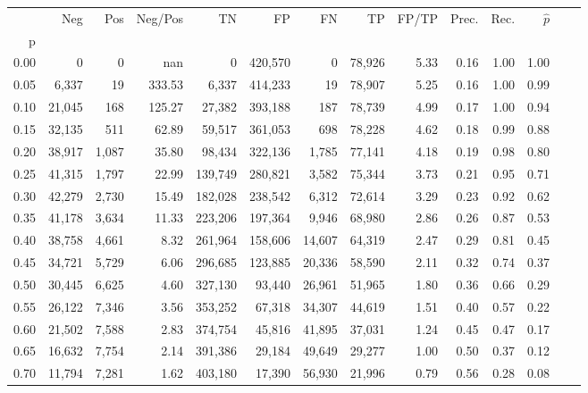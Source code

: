 \begin{tabular}{rrrrrrrrrrrrrr}
\toprule
{} &     Neg &    Pos & Neg/Pos &       TN &       FP &      FN &      TP & FP/TP & Prec. &  Rec. & $\hat{p}$ \\
p    &         &        &         &          &          &         &         &       &       &       &           \\
\midrule
0.00 &       0 &      0 &     nan &        0 &  420,570 &       0 &  78,926 &  5.33 &  0.16 &  1.00 &      1.00 \\
0.05 &   6,337 &     19 &  333.53 &    6,337 &  414,233 &      19 &  78,907 &  5.25 &  0.16 &  1.00 &      0.99 \\
0.10 &  21,045 &    168 &  125.27 &   27,382 &  393,188 &     187 &  78,739 &  4.99 &  0.17 &  1.00 &      0.94 \\
0.15 &  32,135 &    511 &   62.89 &   59,517 &  361,053 &     698 &  78,228 &  4.62 &  0.18 &  0.99 &      0.88 \\
0.20 &  38,917 &  1,087 &   35.80 &   98,434 &  322,136 &   1,785 &  77,141 &  4.18 &  0.19 &  0.98 &      0.80 \\
0.25 &  41,315 &  1,797 &   22.99 &  139,749 &  280,821 &   3,582 &  75,344 &  3.73 &  0.21 &  0.95 &      0.71 \\
0.30 &  42,279 &  2,730 &   15.49 &  182,028 &  238,542 &   6,312 &  72,614 &  3.29 &  0.23 &  0.92 &      0.62 \\
0.35 &  41,178 &  3,634 &   11.33 &  223,206 &  197,364 &   9,946 &  68,980 &  2.86 &  0.26 &  0.87 &      0.53 \\
0.40 &  38,758 &  4,661 &    8.32 &  261,964 &  158,606 &  14,607 &  64,319 &  2.47 &  0.29 &  0.81 &      0.45 \\
0.45 &  34,721 &  5,729 &    6.06 &  296,685 &  123,885 &  20,336 &  58,590 &  2.11 &  0.32 &  0.74 &      0.37 \\
0.50 &  30,445 &  6,625 &    4.60 &  327,130 &   93,440 &  26,961 &  51,965 &  1.80 &  0.36 &  0.66 &      0.29 \\
0.55 &  26,122 &  7,346 &    3.56 &  353,252 &   67,318 &  34,307 &  44,619 &  1.51 &  0.40 &  0.57 &      0.22 \\
0.60 &  21,502 &  7,588 &    2.83 &  374,754 &   45,816 &  41,895 &  37,031 &  1.24 &  0.45 &  0.47 &      0.17 \\
0.65 &  16,632 &  7,754 &    2.14 &  391,386 &   29,184 &  49,649 &  29,277 &  1.00 &  0.50 &  0.37 &      0.12 \\
0.70 &  11,794 &  7,281 &    1.62 &  403,180 &   17,390 &  56,930 &  21,996 &  0.79 &  0.56 &  0.28 &      0.08 \\

\end{tabular}
